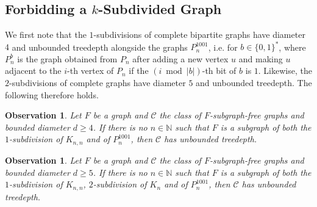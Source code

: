 \documentclass[runningheads,envcountsame]{llncs}
\newtheorem{observation}[theorem]{Observation}
\newcommand{\forbiddenGraph}{F}
\begin{document}
\subsection{Forbidding a $k$-Subdivided Graph}\label{sec:subgraphfor}
 
We first note that the $1$-subdivisions of complete bipartite graphs have
diameter $4$ and unbounded treedepth alongside the graphs
$P_n^{1001}$, i.e. for $b \in \{0,1\}^*$, where $P_n^{b}$ is the graph
obtained from $P_{n}$ after adding a new
vertex $u$ and making $u$ adjacent to the $i$-th
vertex of $P_{n}$ if the $(i \bmod |b|)$-th bit of $b$ is $1$.
Likewise, the $2$-subdivisions of complete graphs
have diameter $5$ and unbounded treedepth. 
The following therefore
holds.
\begin{observation}\label{obs:canonicalUnboundedExamplesDiam4}
  Let $\forbiddenGraph$ be a graph and $\mathcal{C}$ the class of
  $\forbiddenGraph$-subgraph-free graphs and bounded diameter $d
  \geq 4$. If there is no $n\in \mathbb{N}$ such that
  $\forbiddenGraph$ is a subgraph of both the $1$-subdivision of
  $K_{n,n}$ and of $P_n^{1001}$, then
  $\mathcal{C}$ has unbounded treedepth.
\end{observation}
\begin{observation}\label{obs:canonicalUnboundedExamplesDiam5}
    Let $\forbiddenGraph$ be a graph and $\mathcal{C}$ the class of $\forbiddenGraph$-subgraph-free graphs and bounded diameter $d \geq 5$. If there is no $n\in \mathbb{N}$ such that $\forbiddenGraph$ is a subgraph of both the $1$-subdivision of $K_{n,n}$, $2$-subdivision of $K_{n}$ and of $P_n^{1001}$, then $\mathcal{C}$ has unbounded treedepth. 
\end{observation}
\end{document}

